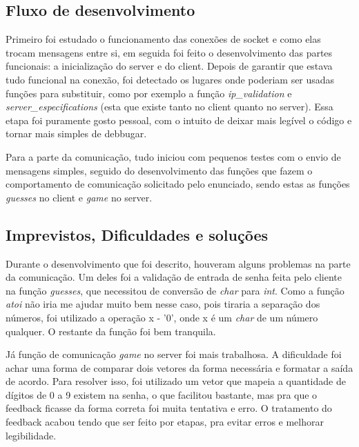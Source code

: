 \documentclass{article}
\begin{document}
        \subsection{Fluxo de desenvolvimento}
        
        \hspace{0.5cm}Primeiro foi estudado o funcionamento das conexões de socket e como elas trocam mensagens
        entre si, em seguida foi feito o desenvolvimento das partes funcionais: a inicialização do server e do client. Depois de garantir que estava tudo funcional
        na conexão, foi detectado os lugares onde poderiam ser usadas funções para substituir, como por exemplo a função  \textit{ip\_validation} e \textit{server\_especifications}
        (esta que existe tanto no client quanto no server). Essa etapa foi puramente gosto pessoal, com o intuito de deixar mais legível o código e tornar mais simples de debbugar.
        
        
        Para a parte da comunicação, tudo iniciou com pequenos testes com o envio de mensagens simples, seguido do desenvolvimento das funções que fazem o comportamento de comunicação solicitado 
        pelo enunciado, sendo estas as funções \textit{guesses} no client e \textit{game} no server. 

        \subsection{Imprevistos, Dificuldades e soluções}

        \hspace{0.5cm}Durante o desenvolvimento que foi descrito, houveram alguns problemas na parte da comunicação. Um deles foi a validação de entrada de senha feita pelo cliente na função \textit{guesses},
        que necessitou de conversão de \textit{char} para \textit{int}. Como a função \textit{atoi} não iria me ajudar muito bem nesse caso, pois tiraria a separação dos números, foi utilizado a operação x - '0',
        onde x é um \textit{char} de um número qualquer. O restante da função foi bem tranquila.

        Já função de comunicação \textit{game} no server foi mais trabalhosa. A dificuldade foi achar uma forma de comparar dois vetores da forma necessária e formatar a saída de acordo. Para resolver isso, foi utilizado
        um vetor que mapeia a quantidade de dígitos de 0 a 9 existem na senha, o que facilitou bastante, mas pra que o feedback ficasse da forma correta foi muita tentativa e erro. O tratamento do feedback acabou tendo que 
        ser feito por etapas, pra evitar erros e melhorar legibilidade.
\end{document}
